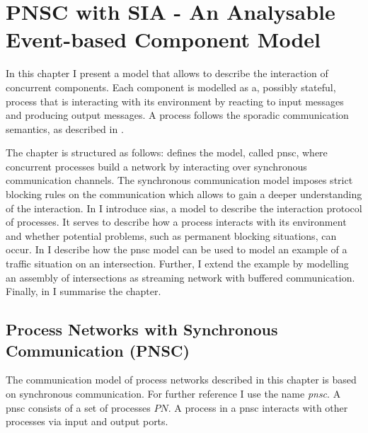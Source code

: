 %
\chapter{PNSC with SIA - An Analysable Event-based Component Model}
\label{chap_ecm}

In this chapter I present a model that allows to describe the interaction of concurrent components.
Each component is modelled as a, possibly stateful, process that is interacting with its environment by reacting to input messages and producing output messages.
A process follows the sporadic communication semantics, as described in \SSect{\ref{sect_background_com}}.

The chapter is structured as follows:
\Sect{\ref{sect_ecm_pnsc}} defines the model, called \gls{pnsc}, where concurrent processes build a network by interacting over synchronous communication channels.
The synchronous communication model imposes strict blocking rules on the communication which allows to gain a deeper understanding of the interaction.
In \Sect{\ref{sect_ecm_sia}} I introduce \glspl{sia}, a model to describe the interaction protocol of processes.
It serves to describe how a process interacts with its environment and whether potential problems, such as permanent blocking situations, can occur.
In \Sect{\ref{sect_ecm_example}} I describe how the \gls{pnsc} model can be used to model an example of a traffic situation on an intersection.
Further, I extend the example by modelling an assembly of intersections as streaming network with buffered communication.
Finally, in \Sect{\ref{sect_ecm_summary}} I summarise the chapter.

\section{Process Networks with Synchronous Communication (PNSC)}
\label{sect_ecm_pnsc}
The communication model of process networks described in this chapter is based on synchronous communication.
For further reference I use the name \emph{\acrfull{pnsc}}.
A \gls{pnsc} consists of a set of processes $PN$.
A process in a \gls{pnsc} interacts with other processes via input and output ports.

